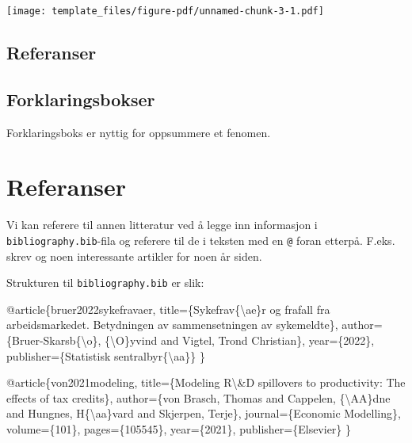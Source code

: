\documentclass[
  10pt,
]{scrartcl}
\newenvironment{Shaded}{\begin{snugshade}}{\end{snugshade}}
\newcommand{\NormalTok}[1]{\textcolor[rgb]{0.00,0.23,0.31}{#1}}
\begin{document}
\texttt{[image: template\_files/figure-pdf/unnamed-chunk-3-1.pdf]}

\subsection{Referanser}\label{referanser}

\subsection{Forklaringsbokser}\label{forklaringsbokser}

\begin{tcolorbox}[enhanced jigsaw, colbacktitle=quarto-callout-note-color!10!white, title=\textcolor{quarto-callout-note-color}{\faInfo}\hspace{0.5em}{Forklaringsboks}, colframe=quarto-callout-note-color-frame, opacityback=0, rightrule=.15mm, bottomrule=.15mm, arc=.35mm, coltitle=black, titlerule=0mm, bottomtitle=1mm, colback=white, left=2mm, leftrule=.75mm, toptitle=1mm, breakable, toprule=.15mm, opacitybacktitle=0.6]

Forklaringsboks er nyttig for oppsummere et fenomen.

\end{tcolorbox}

\section{Referanser}\label{referanser-1}

Vi kan referere til annen litteratur ved å legge inn informasjon i
\texttt{bibliography.bib}-fila og referere til de i teksten med en
\texttt{@} foran etterpå. F.eks. skrev \citet{bruer2022sykefravaer} og
\citet{von2021modeling} noen interessante artikler for noen år siden.

Strukturen til \texttt{bibliography.bib} er slik:

\begin{Shaded}
\begin{Highlighting}[]
\NormalTok{@article\{bruer2022sykefravaer,}
\NormalTok{  title=\{Sykefrav\{\textbackslash{}ae\}r og frafall fra arbeidsmarkedet. Betydningen av sammensetningen av sykemeldte\},}
\NormalTok{  author=\{Bruer{-}Skarsb\{\textbackslash{}o\}, \{\textbackslash{}O\}yvind and Vigtel, Trond Christian\},}
\NormalTok{  year=\{2022\},}
\NormalTok{  publisher=\{Statistisk sentralbyr\{\textbackslash{}aa\}\}}
\NormalTok{\}}

\NormalTok{@article\{von2021modeling,}
\NormalTok{  title=\{Modeling R\textbackslash{}\&D spillovers to productivity: The effects of tax credits\},}
\NormalTok{  author=\{von Brasch, Thomas and Cappelen, \{\textbackslash{}AA\}dne and Hungnes, H\{\textbackslash{}aa\}vard and Skjerpen, Terje\},}
\NormalTok{  journal=\{Economic Modelling\},}
\NormalTok{  volume=\{101\},}
\NormalTok{  pages=\{105545\},}
\NormalTok{  year=\{2021\},}
\NormalTok{  publisher=\{Elsevier\}}
\NormalTok{\}}
\end{Highlighting}
\end{Shaded}
\end{document}
